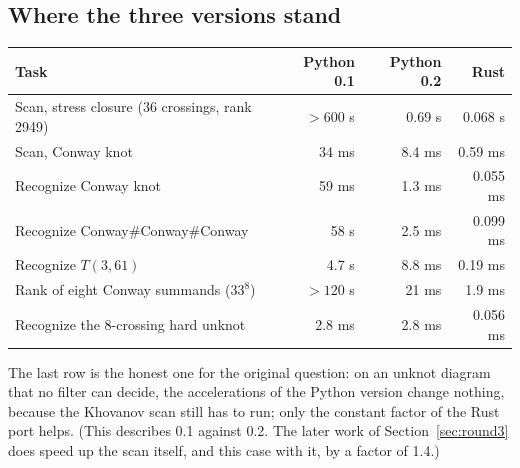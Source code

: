 \subsection{Where the three versions stand}
\begin{center}\small
\begin{tabular}{@{}lrrr@{}}
\toprule
Task & Python 0.1 & Python 0.2 & Rust \\
\midrule
Scan, stress closure (36 crossings, rank 2949) & $>600$ s & 0.69 s & 0.068 s \\
Scan, Conway knot & 34 ms & 8.4 ms & 0.59 ms \\
Recognize Conway knot & 59 ms & 1.3 ms & 0.055 ms \\
Recognize Conway\#Conway\#Conway & 58 s & 2.5 ms & 0.099 ms \\
Recognize $T(3,61)$ & 4.7 s & 8.8 ms & 0.19 ms \\
Rank of eight Conway summands ($33^8$) & $>120$ s & 21 ms & 1.9 ms \\
Recognize the 8-crossing hard unknot & 2.8 ms & 2.8 ms & 0.056 ms \\
\bottomrule
\end{tabular}
\end{center}
The last row is the honest one for the original question: on an unknot diagram
that no filter can decide, the accelerations of the Python version change
nothing, because the Khovanov scan still has to run; only the constant factor
of the Rust port helps. (This describes 0.1 against 0.2. The later work of
Section~\ref{sec:round3} does speed up the scan itself, and this case with it,
by a factor of 1.4.)
